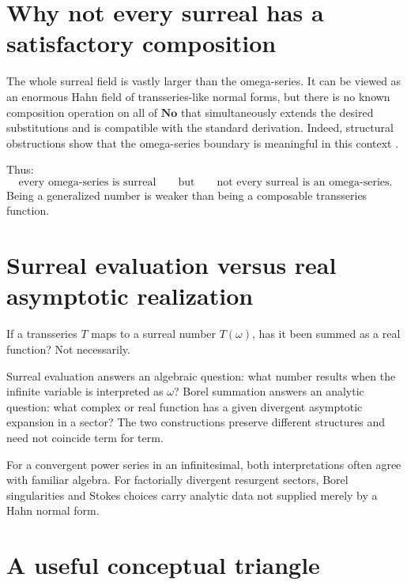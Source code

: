 \documentclass[11pt,openany]{book}
\theoremstyle{definition}
\theoremstyle{plain}
\theoremstyle{remark}
\begin{document}
\section{Why not every surreal has a satisfactory composition}

The whole surreal field is vastly larger than the omega-series. It can be viewed as an enormous Hahn field of transseries-like normal forms, but there is no known composition operation on all of $\mathbf{No}$ that simultaneously extends the desired substitutions and is compatible with the standard derivation. Indeed, structural obstructions show that the omega-series boundary is meaningful in this context \cite{berarducci-mantova-germs}.

Thus:
\[
 \boxed{\text{every omega-series is surreal}}
 \qquad\text{but}\qquad
 \boxed{\text{not every surreal is an omega-series}.}
\]
Being a generalized number is weaker than being a composable transseries function.

\section{Surreal evaluation versus real asymptotic realization}

If a transseries $T$ maps to a surreal number $T(\omega)$, has it been summed as a real function? Not necessarily.

Surreal evaluation answers an algebraic question: what number results when the infinite variable is interpreted as $\omega$? Borel summation answers an analytic question: what complex or real function has a given divergent asymptotic expansion in a sector? The two constructions preserve different structures and need not coincide term for term.

For a convergent power series in an infinitesimal, both interpretations often agree with familiar algebra. For factorially divergent resurgent sectors, Borel singularities and Stokes choices carry analytic data not supplied merely by a Hahn normal form.

\section{A useful conceptual triangle}

\begin{center}
\end{center}
\end{document}
